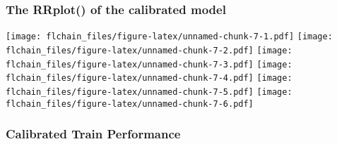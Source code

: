 \documentclass[
]{article}
\newenvironment{Shaded}{\begin{snugshade}}{\end{snugshade}}
\newcommand{\AttributeTok}[1]{\textcolor[rgb]{0.13,0.29,0.53}{#1}}
\newcommand{\FloatTok}[1]{\textcolor[rgb]{0.00,0.00,0.81}{#1}}
\newcommand{\FunctionTok}[1]{\textcolor[rgb]{0.13,0.29,0.53}{\textbf{#1}}}
\newcommand{\NormalTok}[1]{#1}
\newcommand{\OtherTok}[1]{\textcolor[rgb]{0.56,0.35,0.01}{#1}}
\newcommand{\SpecialCharTok}[1]{\textcolor[rgb]{0.81,0.36,0.00}{\textbf{#1}}}
\newcommand{\StringTok}[1]{\textcolor[rgb]{0.31,0.60,0.02}{#1}}
\begin{document}
\hypertarget{the-rrplot-of-the-calibrated-model}{%
\subsubsection{The RRplot() of the calibrated
model}\label{the-rrplot-of-the-calibrated-model}}

\begin{Shaded}
\end{Shaded}

\texttt{[image: flchain\_files/figure-latex/unnamed-chunk-7-1.pdf]}
\texttt{[image: flchain\_files/figure-latex/unnamed-chunk-7-2.pdf]}
\texttt{[image: flchain\_files/figure-latex/unnamed-chunk-7-3.pdf]}
\texttt{[image: flchain\_files/figure-latex/unnamed-chunk-7-4.pdf]}
\texttt{[image: flchain\_files/figure-latex/unnamed-chunk-7-5.pdf]}
\texttt{[image: flchain\_files/figure-latex/unnamed-chunk-7-6.pdf]}

\hypertarget{calibrated-train-performance}{%
\subsubsection{Calibrated Train
Performance}\label{calibrated-train-performance}}

\begin{Shaded}
\end{Shaded}
\end{document}
